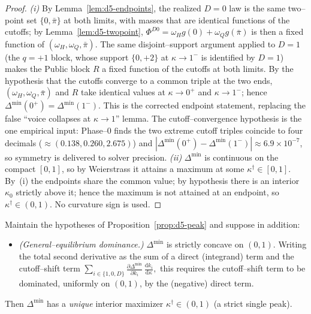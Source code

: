 \begin{proof}
\emph{(i)} By Lemma~\ref{lem:d5-endpoints}, the realized $D=0$ law is the same
two--point set $\{0,\bar\pi\}$ at both limits, with masses that are identical
functions of the cutoffs; by Lemma~\ref{lem:d5-twopoint},
$\Phi^{D0}=\omega_H g(0)+\omega_Q g(\bar\pi)$ is then a fixed function of
$(\omega_H,\omega_Q,\bar\pi)$. The same disjoint--support argument applied to
$D=1$ (the $q=+1$ block, whose support $\{0,+2\}$ at $\kappa\to1^-$ is
identified by $D=1$) makes the Public block $R$ a fixed function of the cutoffs
at both limits. By the hypothesis that the cutoffs converge to a common triple
at the two ends, $(\omega_H,\omega_Q,\bar\pi)$ and $R$ take identical values at
$\kappa\to0^+$ and $\kappa\to1^-$; hence $\Delta^{\min}(0^+)=\Delta^{\min}(1^-)$.
This is the corrected endpoint statement, replacing the false ``voice collapses
at $\kappa\to1$'' lemma. The cutoff--convergence hypothesis is the one
empirical input: Phase--0 finds the two extreme cutoff triples coincide to four
decimals ($\approx(0.138,0.260,2.675)$) and
$|\Delta^{\min}(0^+)-\Delta^{\min}(1^-)|\approx6.9\times10^{-7}$, so symmetry is
delivered to solver precision. %
\emph{(ii)} $\Delta^{\min}$ is continuous on the compact $[0,1]$, so by
Weierstrass it attains a maximum at some $\kappa^{\dagger}\in[0,1]$. By~(i) the
endpoints share the common value; by hypothesis there is an interior $\kappa_0$
strictly above it; hence the maximum is not attained at an endpoint, so
$\kappa^{\dagger}\in(0,1)$. No curvature sign is used.
\end{proof}

\begin{namedclaim}
\label{claim:d5-singlepeak}
Maintain the hypotheses of Proposition~\ref{prop:d5-peak} and suppose in
addition:
\begin{itemize}
\item[\textnormal{(GE--dom)}] \emph{(General--equilibrium dominance.)}
$\Delta^{\min}$ is strictly concave on $(0,1)$. Writing the total second
derivative as the sum of a direct (integrand) term and the cutoff--shift term
\(
  \sum_{i\in\{1,0,D\}}\frac{\partial\Delta^{\min}}{\partial k_i}\,
  \frac{\mathrm d k_i}{\mathrm d\kappa},
\)
this requires the cutoff--shift term to be dominated, uniformly on $(0,1)$, by
the (negative) direct term.
\end{itemize}
Then $\Delta^{\min}$ has a \emph{unique} interior maximizer
$\kappa^{\dagger}\in(0,1)$ (a strict single peak).
\end{namedclaim}


